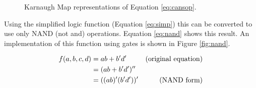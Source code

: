 \documentclass[12pt]{article}
\begin{document}
\begin{figure}[!hbt]
\begin{center}







\end{center}
\caption{Karnaugh Map representations of Equation \ref{eq:cansop}.}
\label{fig:karnmap}
\end{figure}

Using the simplified logic function (Equation \ref{eq:simp}) this
can be converted to use only NAND (not and) operations.
Equation \ref{eq:nand} shows this result.
An implementation of this function using gates is shown in Figure \ref{fig:nand}.

\begin{align}
f(a,b,c,d) &= a b + b'd' &\mbox{(original equation)} \notag \\
	&= (a b + b'd')'' \notag \\
	&= ((ab)' (b'd'))' &\mbox{(NAND form)} \label{eq:nand}
\end{align}
\end{document}
